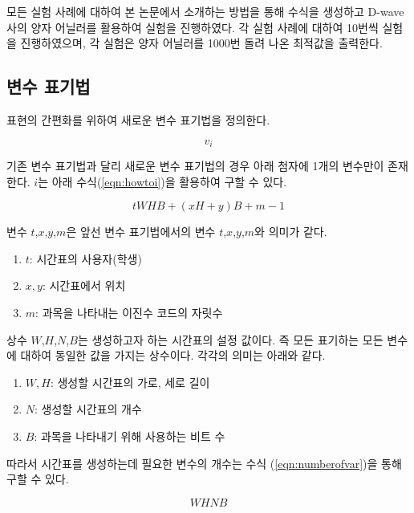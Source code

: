 \documentclass[12pt,a4paper]{article}
\begin{document}
    모든 실험 사례에 대하여 본 논문에서 소개하는 방법을 통해 수식을 생성하고 D-wave사의 양자 어닐러를 활용하여 실험을 진행하였다. 각 실험 사례에 대하여 10번씩 실험을 진행하였으며, 각 실험은 양자 어닐러를 1000번 돌려 나온 최적값을 출력한다.

    \subsection{변수 표기법}

    표현의 간편화를 위하여 새로운 변수 표기법을 정의한다.

    \begin{equation}\label{eqn:newvar}
        v_{i}
    \end{equation}

    기존 변수 표기법과 달리 새로운 변수 표기법의 경우 아래 첨자에 1개의 변수만이 존재한다. $i$는 아래 수식(\ref{eqn:howtoi})을 활용하여 구할 수 있다.

    \begin{equation}\label{eqn:howtoi}
        tWHB+(xH+y)B+m-1
    \end{equation}

    변수 $t$,$x$,$y$,$m$은 앞선 변수 표기법에서의 변수 $t$,$x$,$y$,$m$와 의미가 같다.

    \begin{enumerate}
        \item [] $t$: 시간표의 사용자(학생)
        \item [] $x,y$: 시간표에서 위치
        \item [] $m$: 과목을 나타내는 이진수 코드의 자릿수
    \end{enumerate}

    상수 $W$,$H$,$N$,$B$는 생성하고자 하는 시간표의 설정 값이다. 즉 모든 표기하는 모든 변수에 대하여 동일한 값을 가지는 상수이다. 각각의 의미는 아래와 같다.

    \begin{enumerate}
        \item [] $W,H$: 생성할 시간표의 가로, 세로 길이
        \item [] $N$: 생성할 시간표의 개수
        \item [] $B$: 과목을 나타내기 위해 사용하는 비트 수
    \end{enumerate}

    따라서 시간표를 생성하는데 필요한 변수의 개수는 수식 (\ref{eqn:numberofvar})을 통해 구할 수 있다.

    \begin{equation}\label{eqn:numberofvar}
        WHNB
    \end{equation}
\end{document}
